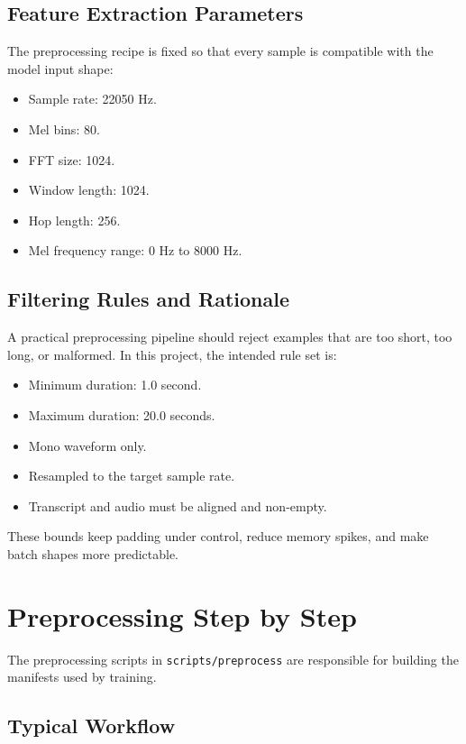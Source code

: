 \documentclass[11pt]{article}
\newcommand{\pathtt}[1]{\texttt{#1}}
\begin{document}
\subsection{Feature Extraction Parameters}

The preprocessing recipe is fixed so that every sample is compatible with the model input shape:

\begin{itemize}[leftmargin=1.5em]
  \item Sample rate: 22050 Hz.
  \item Mel bins: 80.
  \item FFT size: 1024.
  \item Window length: 1024.
  \item Hop length: 256.
  \item Mel frequency range: 0 Hz to 8000 Hz.
\end{itemize}

\subsection{Filtering Rules and Rationale}

A practical preprocessing pipeline should reject examples that are too short, too long, or malformed. In this project, the intended rule set is:

\begin{itemize}[leftmargin=1.5em]
  \item Minimum duration: 1.0 second.
  \item Maximum duration: 20.0 seconds.
  \item Mono waveform only.
  \item Resampled to the target sample rate.
  \item Transcript and audio must be aligned and non-empty.
\end{itemize}

These bounds keep padding under control, reduce memory spikes, and make batch shapes more predictable.

\section{Preprocessing Step by Step}

The preprocessing scripts in \pathtt{scripts/preprocess} are responsible for building the manifests used by training.

\subsection{Typical Workflow}
\end{document}
